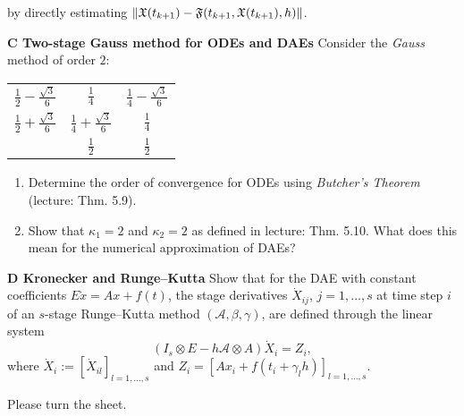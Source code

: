 \documentclass[a4paper,10pt]{article}
\begin{document}
by directly estimating $\lVert\mathfrak X(t_{k+1}) - \mathfrak F(t_{k+1}, \mathfrak X(t_{k+1}), h) \rVert$.

\smallskip

{\bf C Two-stage Gauss method for ODEs and DAEs}
Consider the \emph{Gauss} method of order $2$:
\begin{table}[h]
	\centering
	\begin{tabular}{c|cc}
		$\frac 12 -\frac{\sqrt{3}}{6} $ &$ \frac 14$ &$\frac 14 -\frac{\sqrt{3}}{6}$ \\
		$\frac 12 +\frac{\sqrt{3}}{6}$ &$ \frac 14 + \frac{\sqrt{3}}{6}$ &$ \frac 14$\\
		\hline
		&$\frac 12$&$\frac 12$
	\end{tabular}
\end{table}
\begin{enumerate}
	\item Determine the order of convergence for ODEs using \emph{Butcher's Theorem} (lecture: Thm. 5.9).
	\item Show that $\kappa_1=2$ and $\kappa_2=2$ as defined in lecture: Thm. 5.10. What does this mean for the numerical approximation of DAEs?
\end{enumerate}
\smallskip

{\bf D Kronecker and Runge--Kutta}
Show that for the DAE with constant coefficients $E\dot x = Ax+f(t)$, the stage derivatives $\dot X_{ij}$, $j=1,\dots, s$ at time step $i$ of an $s$-stage Runge--Kutta method $(\mathcal A, \beta, \gamma)$, are defined through the linear system
\begin{equation*}
	(I_s \otimes E - h \mathcal A\otimes A) \dot X_i = Z_i,
\end{equation*}
where $\dot X_i := [\dot X_{il}]_{l=1,\dots,s}$ and $Z_i = [Ax_{i}+f(t_{i}+\gamma_lh) ]_{l=1,\dots,s}$.
\smallskip

\begin{flushright}
	Please turn the sheet.
\end{flushright}

\newpage
\end{document}
